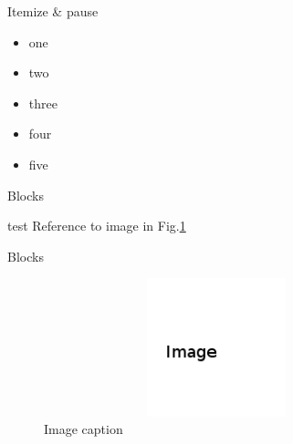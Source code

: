 \documentclass[aspectratio=169,xcolor=table]{beamer}
\begin{document}
\begin{frame}{Itemize \& pause}
						\begin{itemize}
							\item one
							\pause
							\item two
							\pause
							\item three
														\pause
							\item four
														\pause
							\item five
						\end{itemize}
	\end{frame}	
	
	\begin{frame}{Blocks}
\begin{block}{test}
Reference to image in Fig.\ref{imagelable}
\end{block}
	\end{frame}	
	
		\begin{frame}{Blocks}
		\begin{figure}
		\includegraphics[width=10cm, height=4cm]{image}
		  \caption{Image caption}
		  \label{imagelable}
		\end{figure}
		\end{frame}	
		
		
			
\end{document}
